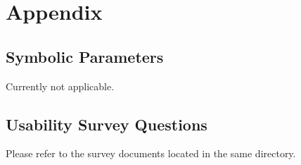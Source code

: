 \documentclass[12pt,letterpaper]{article}
\begin{document}
	\section{Appendix}
	\subsection{Symbolic Parameters}
Currently not applicable.\\

	\subsection{Usability Survey Questions}
Please refer to the survey documents located in the same directory.\\
\end{document}
